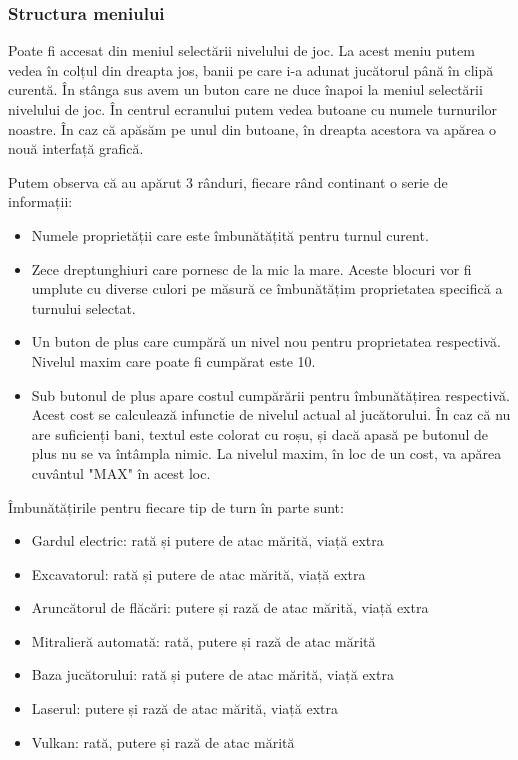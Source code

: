 \documentclass[12pt, a4paper]{article}
\begin{document}
	\subsubsection{Structura meniului}
	
	Poate fi accesat din meniul selectării nivelului de joc. La acest meniu putem vedea în colțul din dreapta jos, banii pe care i-a adunat jucătorul până în clipă curentă. În stânga sus avem un buton care ne duce înapoi la meniul selectării nivelului de joc. În centrul ecranului putem vedea butoane cu numele turnurilor noastre. În caz că apăsăm pe unul din butoane, în dreapta acestora va apărea o nouă interfață grafică.
	\newline
	
	Putem observa că au apărut 3 rânduri, fiecare rând continant o serie de informații:
	
	\begin{itemize}
		\item Numele proprietății care este îmbunătățită pentru turnul curent.
		\item Zece dreptunghiuri care pornesc de la mic la mare. Aceste blocuri vor fi umplute cu diverse culori pe măsură ce îmbunătățim proprietatea specifică a turnului selectat.
		\item Un buton de plus care cumpără un nivel nou pentru proprietatea respectivă. Nivelul maxim care poate fi cumpărat este 10.
		\item Sub butonul de plus apare costul cumpărării pentru îmbunătățirea respectivă. Acest cost se calculează infunctie de nivelul actual al jucătorului. În caz că nu are suficienți bani, textul este colorat cu roșu, și dacă apasă pe butonul de plus nu se va întâmpla nimic. La nivelul maxim, în loc de un cost, va apărea cuvântul "MAX" în acest loc.
	\end{itemize}
	
	Îmbunătățirile pentru fiecare tip de turn în parte sunt:
	
	\begin{itemize}
		\item Gardul electric: rată și putere de atac mărită, viață extra
		\item Excavatorul: rată și putere de atac mărită, viață extra
		\item Aruncătorul de flăcări: putere și rază de atac mărită, viață extra
		\item Mitralieră automată: rată, putere și rază de atac mărită
		\item Baza jucătorului: rată și putere de atac mărită, viață extra
		\item Laserul: putere și rază de atac mărită, viață extra
		\item Vulkan: rată, putere și rază de atac mărită
	\end{itemize}
	
\end{document}
